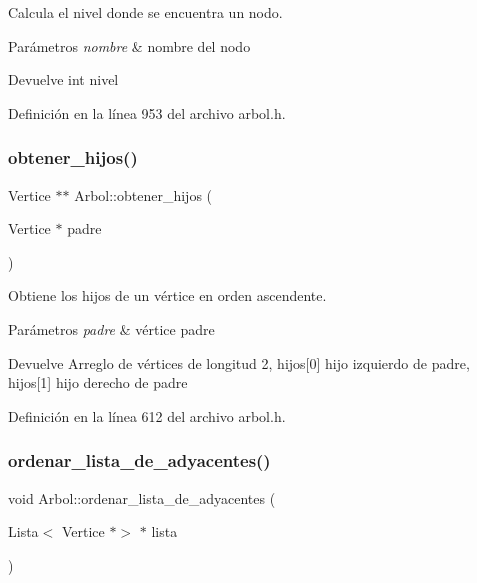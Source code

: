 Calcula el nivel donde se encuentra un nodo. 


\begin{DoxyParams}{Parámetros}
{\em nombre} & nombre del nodo \\
\hline
\end{DoxyParams}
\begin{DoxyReturn}{Devuelve}
int nivel 
\end{DoxyReturn}


Definición en la línea 953 del archivo arbol.\+h.

\mbox{\label{classArbol_a18066699977ab8095398d026ef2a13ac}} 
\subsubsection{\texorpdfstring{obtener\+\_\+hijos()}{obtener\_hijos()}}
{\footnotesize\ttfamily Vertice $\ast$$\ast$ Arbol\+::obtener\+\_\+hijos (\begin{DoxyParamCaption}\item[{Vertice $\ast$}]{padre }\end{DoxyParamCaption})\hspace{0.3cm}{\ttfamily [protected]}}



Obtiene los hijos de un vértice en orden ascendente. 


\begin{DoxyParams}{Parámetros}
{\em padre} & vértice padre \\
\hline
\end{DoxyParams}
\begin{DoxyReturn}{Devuelve}
Arreglo de vértices de longitud 2, hijos\mbox{[}0\mbox{]} hijo izquierdo de padre, hijos\mbox{[}1\mbox{]} hijo derecho de padre 
\end{DoxyReturn}


Definición en la línea 612 del archivo arbol.\+h.

\mbox{\label{classArbol_aeb7dff584795382d8e8a1a4694d0ac4e}} 
\subsubsection{\texorpdfstring{ordenar\+\_\+lista\+\_\+de\+\_\+adyacentes()}{ordenar\_lista\_de\_adyacentes()}}
{\footnotesize\ttfamily void Arbol\+::ordenar\+\_\+lista\+\_\+de\+\_\+adyacentes (\begin{DoxyParamCaption}\item[{Lista$<$ Vertice $\ast$$>$ $\ast$}]{lista }\end{DoxyParamCaption})\hspace{0.3cm}{\ttfamily [protected]}}



